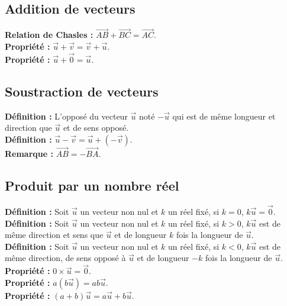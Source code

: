 \documentclass[a4paper,titlepage]{article}
\begin{document}
    \subsection{Addition de vecteurs}
        \textbf{Relation de Chasles :} $\overrightarrow{AB}+\overrightarrow{BC}=\overrightarrow{AC}$.
        \\
        \textbf{Propriété :} $\vec{u}+\vec{v}=\vec{v}+\vec{u}$.
        \\
        \textbf{Propriété :} $\vec{u}+\overrightarrow{0}=\vec{u}$.
    \subsection{Soustraction de vecteurs}
        \textbf{Définition :} L’opposé du vecteur $\vec{u}$ noté $-\vec{u}$ qui est de même longueur et direction que $\vec{u}$ et de sens opposé.
        \\
        \textbf{Définition :} $\vec{u}-\vec{v}=\vec{u}+\left(-\vec{v}\right)$.
        \\
        \textbf{Remarque :} $\overrightarrow{AB}=-\overrightarrow{BA}$.
    \subsection{Produit par un nombre réel}
        \textbf{Définition :} Soit $\vec{u}$ un vecteur non nul et $k$ un réel fixé, si $k=0$, $k\vec{u}=\overrightarrow{0}$.
        \\
        \textbf{Définition :} Soit $\vec{u}$ un vecteur non nul et $k$ un réel fixé, si $k>0$, $k\vec{u}$ est de même direction et sens que $\vec{u}$ et de longueur $k$ fois la longueur de $\vec{u}$.
        \\
        \textbf{Définition :} Soit $\vec{u}$ un vecteur non nul et $k$ un réel fixé, si $k<0$, $k\vec{u}$ est de même direction, de sens opposé à $\vec{u}$ et de longueur $-k$ fois la longueur de $\vec{u}$.
        \\
        \textbf{Propriété :} $0\times\vec{u}=\overrightarrow{0}$.
        \\
        \textbf{Propriété :} $a\left(b\vec{u}\right)=ab\vec{u}$.
        \\
        \textbf{Propriété :} $\left(a+b\right)\vec{u}=a\vec{u}+b\vec{u}$.
\end{document}
